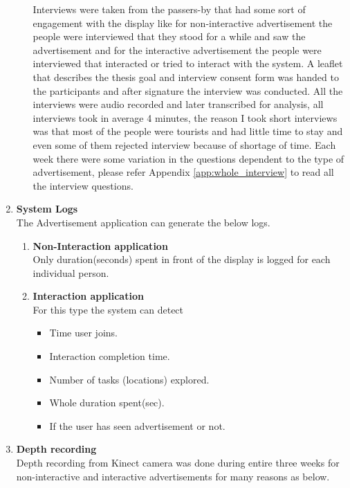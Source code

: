 \begin{enumerate}
\begin{enumerate}
Interviews were taken from the passers-by that had some sort of engagement with the display like for non-interactive advertisement the people were interviewed that they stood for a while and saw the advertisement and for the interactive advertisement the people were interviewed that interacted or tried to interact with the system.
A leaflet that describes the thesis goal and interview consent form was handed to the participants and after signature the interview was conducted. All the interviews were audio recorded and later transcribed for analysis, all interviews took in average 4 minutes, the reason I took short interviews was that most of the people were tourists and had little time to stay and even some of them rejected interview because of shortage of time.
Each week there were some variation in the questions dependent to the type of advertisement, please refer Appendix \ref{app:whole_interview} to read all the interview questions.


\end{enumerate}


\item \textbf{System Logs} \\
The Advertisement application can generate the below logs.
\begin{enumerate}
\item	\textbf{Non-Interaction application} \\
Only duration(seconds) spent in front of the display is logged for each individual person.

\item	\textbf{Interaction application}\\
For this type the system can detect

\begin{itemize}
\item	Time user joins.
\item	Interaction completion time.
\item	Number of tasks (locations) explored.
\item	Whole duration spent(sec).
\item	If the user has seen advertisement or not.
\end{itemize}

\end{enumerate}

\item \textbf{Depth recording} \\
Depth recording from Kinect camera was done during entire three weeks for non-interactive and interactive advertisements for many reasons as below.


\end{enumerate}
